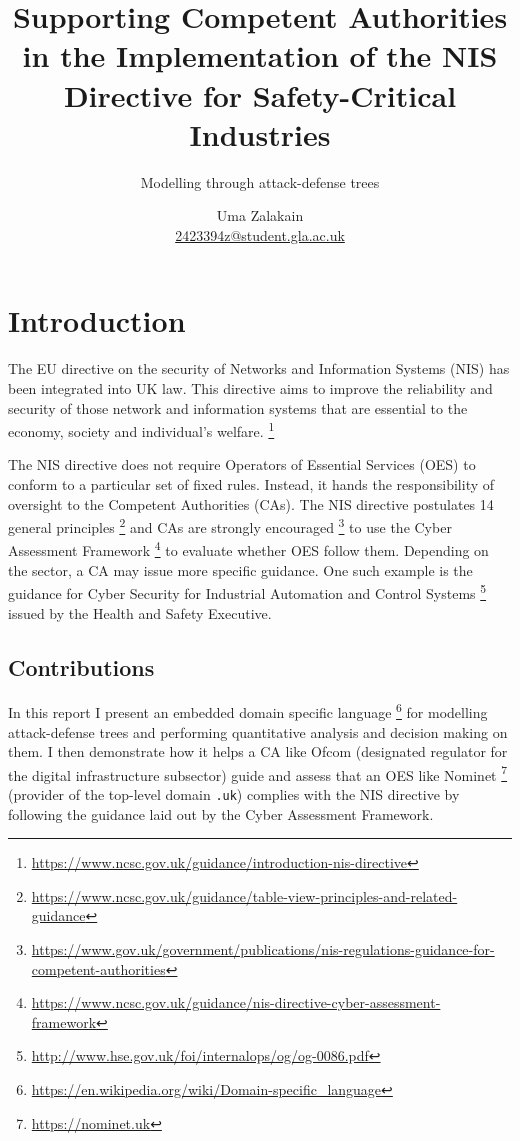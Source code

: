 \documentclass{scrreprt}
\begin{document}
\title{Supporting Competent Authorities in the Implementation of the NIS
Directive for Safety-Critical Industries}
\subtitle{Modelling through attack-defense trees}
\author{Uma Zalakain \\ \href{mailto:2423394z@student.gla.ac.uk}{2423394z@student.gla.ac.uk}}

{\let\newpage\relax\maketitle}
\doclicenseThis
\newpage

\setcounter{tocdepth}{2}
\tableofcontents
\newpage
{}

\chapter{Introduction}

The EU directive on the security of Networks and Information Systems (NIS) has
been integrated into UK law. This directive aims to improve the reliability and
security of those network and information systems that are essential to the
economy, society and individual's welfare.
\footnote{\url{https://www.ncsc.gov.uk/guidance/introduction-nis-directive}}

The NIS directive does not require Operators of Essential Services (OES) to
conform to a particular set of fixed rules. Instead, it hands the responsibility
of oversight to the Competent Authorities (CAs). The NIS directive postulates 14
general principles
\footnote{\url{https://www.ncsc.gov.uk/guidance/table-view-principles-and-related-guidance}}
and CAs are strongly encouraged
\footnote{\url{https://www.gov.uk/government/publications/nis-regulations-guidance-for-competent-authorities}}
to use the Cyber Assessment Framework
\footnote{\url{https://www.ncsc.gov.uk/guidance/nis-directive-cyber-assessment-framework}}
to evaluate whether OES follow them. Depending on the sector, a CA may issue
more specific guidance. One such example is the guidance for Cyber Security for
Industrial Automation and Control Systems
\footnote{\url{http://www.hse.gov.uk/foi/internalops/og/og-0086.pdf}} issued by
the Health and Safety Executive.

\section{Contributions}

In this report I present an embedded domain specific language
\footnote{\url{https://en.wikipedia.org/wiki/Domain-specific_language}} for
modelling attack-defense trees \cite{Kordy} and performing quantitative analysis
and decision making on them. I then demonstrate how it helps a CA like Ofcom
(designated regulator for the digital infrastructure subsector) guide and assess
that an OES like Nominet \footnote{\url{https://nominet.uk}} (provider of the
top-level domain \texttt{.uk}) complies with the NIS directive by following the
guidance laid out by the Cyber Assessment Framework.
\end{document}
